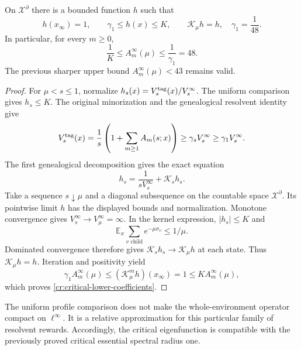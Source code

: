 \begin{theorem}
\label{cr:eigenfunction}
On $\mathcal X^\partial$ there is a bounded function $h$ such that
\begin{equation}
 h(x_\infty)=1,\qquad
 \gamma_1\le h(x)\le K,\qquad
 \mathcal K_\mu h=h,
 \quad\gamma_1=\frac1{48}.
 \label{cr:eigenfunction-bounds}
\end{equation}
In particular, for every $m\ge0$,
\begin{equation}
 \boxed{\frac1K\le A_m^\infty(\mu)\le\frac1{\gamma_1}=48.}
 \label{cr:critical-lower-coefficients}
\end{equation}
The previous sharper upper bound $A_m^\infty(\mu)<43$ remains valid.
\end{theorem}
\begin{proof}
For $\mu<s\le1$, normalize
$h_s(x)=V_s^{\rm tag}(x)/V_s^\infty$.  The uniform comparison gives
$h_s\le K$.  The original minorization and the genealogical resolvent
identity give
\[
 V_s^{\rm tag}(x)
 =\frac1s\left(1+\sum_{m\ge1}A_m(s;x)\right)
 \ge\gamma_s V_s^\infty\ge\gamma_1 V_s^\infty.
\]
The first genealogical decomposition gives the exact equation
\[
 h_s=\frac1{sV_s^\infty}+\mathcal K_s h_s.
\]
Take a sequence $s\downarrow\mu$ and a diagonal subsequence on the
countable space $\mathcal X^\partial$.  Its pointwise limit $h$ has
the displayed bounds and normalization.  Monotone convergence gives
$V_s^\infty\to V_\mu^\infty=\infty$.  In the kernel expression,
$|h_s|\le K$ and
\[
 \mathbb E_x\sum_{v\text{ child}}e^{-\mu\sigma_v}\le1/\mu.
\]
Dominated convergence therefore gives
$\mathcal K_s h_s\to\mathcal K_\mu h$ at each state.  Thus
$\mathcal K_\mu h=h$.  Iteration and positivity yield
\[
 \gamma_1 A_m^\infty(\mu)
 \le(\mathcal K_\mu^m h)(x_\infty)=1
 \le K A_m^\infty(\mu),
\]
which proves \eqref{cr:critical-lower-coefficients}.
\end{proof}

The uniform profile comparison does not make the whole-environment
operator compact on $\ell^\infty$.  It is a relative approximation
for this particular family of resolvent rewards.  Accordingly, the
critical eigenfunction is compatible with the previously proved
critical essential spectral radius one.

